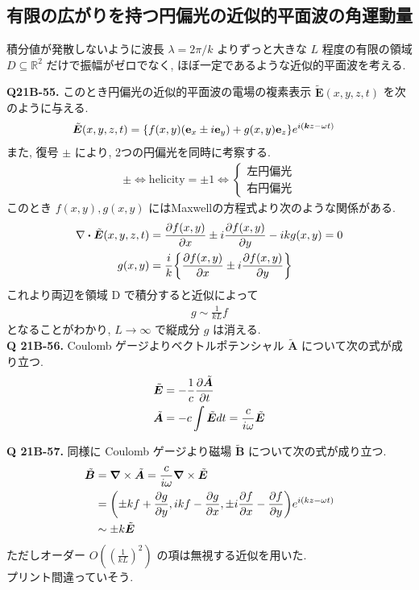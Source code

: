 \documentclass[uplatex,dvipdfmx,a4paper,11pt]{jlreq}
\newcommand{\RR}{\mathbb{R}}
\newcommand{\BB}{\bm{B}}
\renewcommand{\AA}{\bm{A}}
\newcommand{\kk}{\bm{k}}
\newcommand{\ET}{\tilde{\bm{E}}}
\theoremstyle{definition}
\begin{document}
\subsection{有限の広がりを持つ円偏光の近似的平面波の角運動量}
積分値が発散しないように波長 $\lambda=2\pi/k$ よりずっと大きな $L$ 程度の有限の領域 $D\subseteq\RR^2$ だけで振幅がゼロでなく, ほぼ一定であるような近似的平面波を考える. \\
\begin{proposition}[円筒対称性]
\end{proposition}

\textbf{Q21B-55.}
このとき円偏光の近似的平面波の電場の複素表示 $\ET(x,y,z,t)$ を次のように与える.
\begin{align}
  \ET(x,y,z,t) & = \qty{f(x,y)(\vb{e}_x\pm i\vb{e}_y) + g(x,y)\vb{e}_z}e^{i(\kk z-\omega t)} \label{def ET D}
\end{align}
また, 復号 $\pm$ により, 2つの円偏光を同時に考察する.
\begin{align}
  \pm\iff \mathrm{helicity} = \pm 1 \iff \begin{cases}
                                           左円偏光 \\
                                           右円偏光
                                         \end{cases}
\end{align}
このとき $f(x,y), g(x,y)$ にはMaxwellの方程式より次のような関係がある.
\begin{align}
  \nabla\vdot\ET(x,y,z,t) & = \pdv{f(x,y)}{x}\pm i\pdv{f(x,y)}{y} - i kg(x,y) = 0  \\
  g(x,y)                  & = \frac{i}{k}\qty{\pdv{f(x,y)}{x}\pm i\pdv{f(x,y)}{y}}
\end{align}
これより両辺を領域 D で積分すると近似によって
\begin{align}
  g\sim\frac{1}{kL}f
\end{align}
となることがわかり, $L\to\infty$ で縦成分 $g$ は消える. \\

\textbf{Q 21B-56.}
Coulomb ゲージよりベクトルポテンシャル $\tilde{\AA}$ について次の式が成り立つ.
\begin{align}
  \ET         & = -\frac{1}{c}\pdv{\tilde{\AA}}{t}    \\
  \tilde{\AA} & = -c\int\ET dt = \frac{c}{i\omega}\ET
\end{align}

\textbf{Q 21B-57.}
同様に Coulomb ゲージより磁場 $\tilde{\BB}$ について次の式が成り立つ.
\begin{align}
  \tilde{\BB} & = \vnabla\times\tilde{\AA} = \frac{c}{i\omega}\vnabla\times\ET                               \\
              & = \qty(\pm kf + \pdv{g}{y}, ikf -\pdv{g}{x}, \pm i\pdv{f}{x} - \pdv{f}{y})e^{i(kz-\omega t)} \\
              & \sim \pm k\ET
\end{align}
ただしオーダー $O((\frac{1}{kL})^2)$ の項は無視する近似を用いた. \\
プリント間違っていそう. \\
\end{document}
